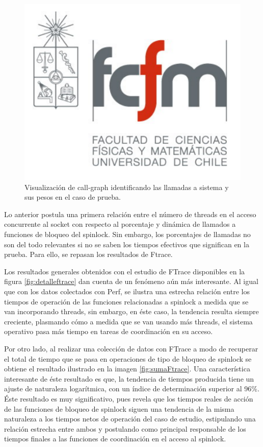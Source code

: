 \begin{figure}[!h]
	\centering
	\includegraphics[scale=.5]{imagenes/fcfm}
	\caption{Visualización de call-graph identificando las llamadas a sistema y sus pesos en el caso de prueba.}
	\label{fig:callgraph}
\end{figure}

Lo anterior postula una primera relación entre el número de threads en el acceso concurrente al socket con respecto al porcentaje y dinámica de llamados a funciones de bloqueo del spinlock. Sin embargo, los porcentajes de llamadas no son del todo relevantes si no se saben los tiempos efectivos que significan en la prueba. Para ello, se repasan los resultados de Ftrace.

Los resultados generales obtenidos con el estudio de FTrace disponibles en la figura \ref{fig:detalleftrace} dan cuenta de un fenómeno aún más interesante. Al igual que con los datos colectados con Perf, se ilustra una estrecha relación entre los tiempos de operación de las funciones relacionadas a spinlock a medida que se van incorporando threads, sin embargo, en éste caso, la tendencia resulta siempre creciente, plasmando cómo a medida que se van usando más threads, el sistema operativo pasa más tiempo en tareas de coordinación en su acceso.

Por otro lado, al realizar una colección de datos con FTrace a modo de recuperar el total de tiempo que se pasa en operaciones de tipo de bloqueo de spinlock se obtiene el resultado ilustrado en la imagen \ref{fig:sumaFtrace}. Una característica interesante de éste resultado es que, la tendencia de tiempos producida tiene un ajuste de naturaleza logarítmica, con un índice de determinación superior al 96\%. Éste resultado es muy significativo, pues revela que los tiempos reales de acción de las funciones de bloqueo de spinlock siguen una tendencia de la misma naturaleza a los tiempos netos de operación del caso de estudio, estipulando una relación estrecha entre ambos y postulando como principal responsable de los tiempos finales a las funciones de coordinación en el acceso al spinlock.

